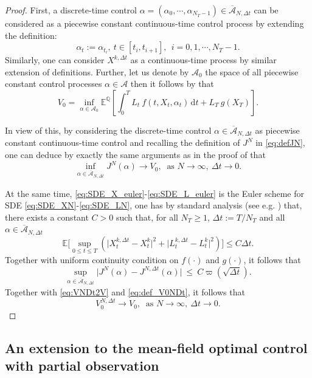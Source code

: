 \documentclass[11pt]{article}
\numberwithin{equation}{section}
\theoremstyle{plain}
\theoremstyle{definition}
\theoremstyle{remark}
\newcommand{\bE}{\mathbb{E}}
\newcommand{\dd}{\mathrm{d}}
\begin{document}
	\begin{proof}
		First, a discrete-time control $\alpha = (\alpha_0, \cdots, \alpha_{N_T-1}) \in \overline{\mathcal{A}}_{N, \Delta t}$ can be considered as a piecewise constant continuous-time control process by extending the definition:
		$$
		\alpha_t := \alpha_{t_i}, ~t \in [t_i, t_{i+1}], ~~i = 0, 1, \cdots, N_T-1.
		$$
		Similarly, one can consider $X^{k,\Delta t}$ as a continuous-time process by similar extension of definitions.
		Further, let us denote by $\mathcal{A}_0$ the space  of all  piecewise constant control processes $\alpha \in \mathcal{A}$
		then it follows by \cite[Proposition A.5]{bouchard2025limit} that 
		$$
		V_0 = \inf_{\alpha \in \mathcal{A}_0} \mathbb{E}^{\mathbb{Q}} 
		\left[ 
		\int_0^T L_t ~f(t, X_t,  \alpha_t)\,\dd t 
		+
		L_T~ g(X_T) 
		\right]. 
		$$
		
		In view of this, by considering the discrete-time control $\alpha \in \overline{\mathcal{A}}_{N, \Delta t}$ as piecewise constant continuous-time control and recalling the definition of $J^N$ in \eqref{eq:defJN},
		one can deduce by exactly the same arguments as in the proof of \cite[Theorem 3.2]{bouchard2025limit} that
		\begin{equation} \label{eq:VNDt2V}
			\inf_{\alpha \in \overline{\mathcal{A}}_{N, \Delta t}} J^N(\alpha) \longrightarrow V_0,
			~\text{ as }N\longrightarrow \infty,~ \Delta t \longrightarrow 0. 
		\end{equation}
		
		At the same time, \eqref{eq:SDE_X_euler}-\eqref{eq:SDE_L_euler} is the Euler scheme for SDE \eqref{eq:SDE_XN}-\eqref{eq:SDE_LN},
		one has by standard analysis (see e.g. \cite{graham2013stochastic}) that, there exists a constant $C> 0$ such that,
		for all $N_T \ge 1$, $\Delta t:= T/N_T$ and all $\alpha \in \overline{\mathcal{A}}_{N, \Delta t}$
		$$
		\bE \Big[ \sup_{0 \le t \le T} \left(\big| X^{k,\Delta t}_t - X^k_t \big|^2 + \big|L_t^{k,\Delta t} - L_t^k\big|^2 \right) \Big] \le C \Delta t.
		$$
		Together with uniform continuity condition on $f(\cdot)$ and $g(\cdot)$, it follows that
		$$
		\sup_{\alpha \in \overline{\mathcal{A}}_{N, \Delta t}} \big| J^N(\alpha) - J^{N, \Delta t} (\alpha) \big| 
		~\le~
		C \varpi(\sqrt{\Delta t}).
		$$
		Together with \eqref{eq:VNDt2V} and \eqref{eq:def_V0NDt}, it follows that
		$$
		V_0^{N, \Delta t} \longrightarrow V_0,  ~\text{ as }N\longrightarrow \infty,~ \Delta t \longrightarrow 0. 
		$$
	\end{proof}
	

	\subsection{An extension to the mean-field optimal control with partial observation} \label{subsec:extension-mfc}
	
\end{document}
